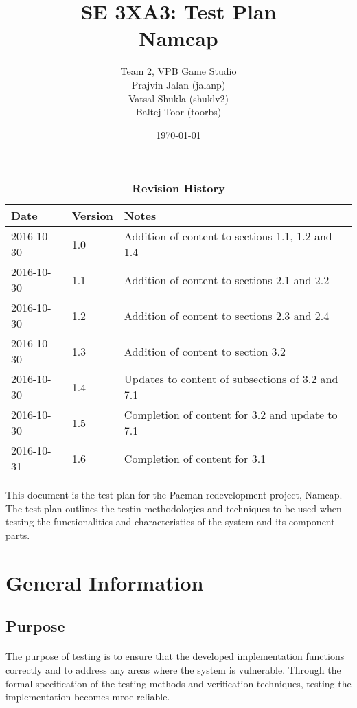 \documentclass[12pt, titlepage]{article}
\title{SE 3XA3: Test Plan\\Namcap}
\author{Team 2, VPB Game Studio
		\\ Prajvin Jalan (jalanp)
		\\ Vatsal Shukla (shuklv2)
		\\ Baltej Toor (toorbs)
}
\date{\today}
\begin{document}
\maketitle

\tableofcontents
\listoftables
\listoffigures

\begin{table}[h]
\caption{\bf Revision History}
\begin{tabularx}{\textwidth}{p{3cm}p{2cm}X}
\toprule {\bf Date} & {\bf Version} & {\bf Notes}\\
\midrule
2016-10-30 & 1.0 & Addition of content to sections 1.1, 1.2 and 1.4\\
2016-10-30 & 1.1 & Addition of content to sections 2.1 and 2.2\\
2016-10-30 & 1.2 & Addition of content to sections 2.3 and 2.4\\
2016-10-30 & 1.3 & Addition of content to section 3.2\\
2016-10-30 & 1.4 & Updates to content of subsections of 3.2 and 7.1\\
2016-10-30 & 1.5 & Completion of content for 3.2 and update to 7.1\\
2016-10-31 & 1.6 & Completion of content for 3.1\\
\bottomrule
\end{tabularx}
\end{table}

\newpage


This document is the test plan for the Pacman redevelopment project, Namcap. The test plan outlines the testin methodologies and techniques to be used when testing the functionalities and characteristics of the system and its component parts.

\section{General Information}

\subsection{Purpose}
\paragraph{}
The purpose of testing is to ensure that the developed implementation functions correctly and to address any areas where the system is vulnerable. Through the formal specification of the testing methods and verification techniques, testing the implementation becomes mroe reliable.
\end{document}
